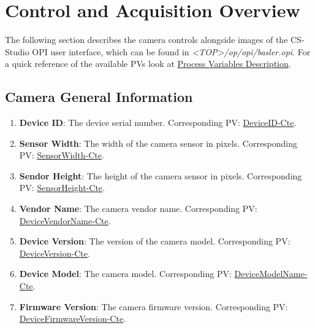 \documentclass[openany]{article}
\begin{document}
\section{Control and Acquisition Overview}

The following section describes the camera controls alongside images of the CS-Studio OPI user interface, which can be found in \emph{\textless TOP\textgreater\slash op\slash opi\slash basler.opi}. For a quick reference of the available PVs look at \hyperref[sec:process-variables]{Process Variables Description}.

    \subsection{Camera General Information}\label{sec:general-info}


        \begin{enumerate}
            \item \textbf{Device ID}: The device serial number.
                            Corresponding PV: \hyperlink{pv:device-id}{DeviceID-Cte}.
            \item \textbf{Sensor Width}: The width of the camera sensor in 
                            pixels. Corresponding PV: 
                            \hyperlink{pv:sensor-width}{SensorWidth-Cte}.
            \item \textbf{Sendor Height}: The height of the camera sensor in 
                            pixels. Corresponding PV: 
                            \hyperlink{pv:sensor-height}{SensorHeight-Cte}.
            \item \textbf{Vendor Name}: The camera vendor name. 
                            Corresponding PV: 
                            \hyperlink{pv:vendor-name}{DeviceVendorName-Cte}.
            \item \textbf{Device Version}: The version of the camera model.
                            Corresponding PV: 
                            \hyperlink{pv:device-version}{DeviceVersion-Cte}.
            \item \textbf{Device Model}: The camera model. 
                            Corresponding PV: 
                            \hyperlink{pv:device-model}{DeviceModelName-Cte}.
            \item \textbf{Firmware Version}: The camera firmware version.
                            Corresponding PV: 
                            \hyperlink{pv:firmware-version}{DeviceFirmwareVersion-Cte}.
        \end{enumerate}
\end{document}

